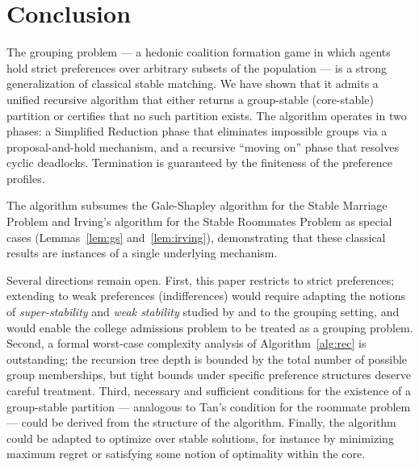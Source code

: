 \documentclass{elsarticle}
\begin{document}
\section{Conclusion}
\label{sec:conclusion}

The grouping problem --- a hedonic coalition formation game in which agents hold strict preferences over arbitrary subsets of the population --- is a strong generalization of classical stable matching. We have shown that it admits a unified recursive algorithm that either returns a group-stable (core-stable) partition or certifies that no such partition exists. The algorithm operates in two phases: a Simplified Reduction phase that eliminates impossible groups via a proposal-and-hold mechanism, and a recursive ``moving on'' phase that resolves cyclic deadlocks. Termination is guaranteed by the finiteness of the preference profiles.

The algorithm subsumes the Gale-Shapley algorithm for the Stable Marriage Problem and Irving's algorithm for the Stable Roommates Problem as special cases (Lemmas~\ref{lem:gs} and~\ref{lem:irving}), demonstrating that these classical results are instances of a single underlying mechanism.

Several directions remain open. First, this paper restricts to strict preferences; extending to weak preferences (indifferences) would require adapting the notions of \emph{super-stability} and \emph{weak stability} studied by \cite{irving94sta} and \cite{irving02} to the grouping setting, and would enable the college admissions problem to be treated as a grouping problem. Second, a formal worst-case complexity analysis of Algorithm~\ref{alg:rec} is outstanding; the recursion tree depth is bounded by the total number of possible group memberships, but tight bounds under specific preference structures deserve careful treatment. Third, necessary and sufficient conditions for the existence of a group-stable partition --- analogous to Tan's condition for the roommate problem \citep{tan91} --- could be derived from the structure of the algorithm. Finally, the algorithm could be adapted to optimize over stable solutions, for instance by minimizing maximum regret or satisfying some notion of optimality within the core.




\end{document}
